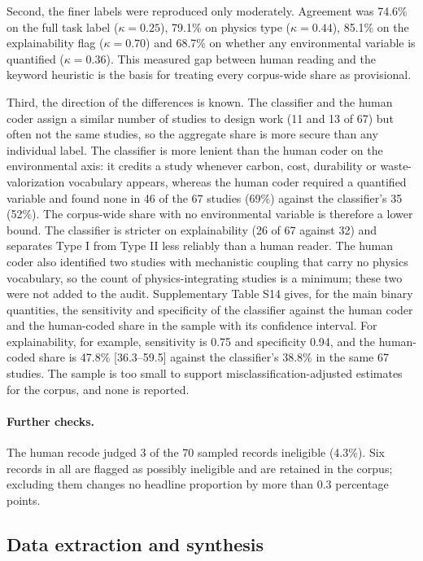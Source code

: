\documentclass[pdflatex,sn-basic]{sn-jnl}
\begin{document}
Second, the finer labels were reproduced only moderately. Agreement was 74.6\% on the full task label ($\kappa = 0.25$), 79.1\% on physics type ($\kappa = 0.44$), 85.1\% on the explainability flag ($\kappa = 0.70$) and 68.7\% on whether any environmental variable is quantified ($\kappa = 0.36$). This measured gap between human reading and the keyword heuristic is the basis for treating every corpus-wide share as provisional.

Third, the direction of the differences is known. The classifier and the human coder assign a similar number of studies to design work (11 and 13 of 67) but often not the same studies, so the aggregate share is more secure than any individual label. The classifier is more lenient than the human coder on the environmental axis: it credits a study whenever carbon, cost, durability or waste-valorization vocabulary appears, whereas the human coder required a quantified variable and found none in 46 of the 67 studies (69\%) against the classifier's 35 (52\%). The corpus-wide share with no environmental variable is therefore a lower bound. The classifier is stricter on explainability (26 of 67 against 32) and separates Type I from Type II less reliably than a human reader. The human coder also identified two studies with mechanistic coupling that carry no physics vocabulary, so the count of physics-integrating studies is a minimum; these two were not added to the audit. Supplementary Table S14 gives, for the main binary quantities, the sensitivity and specificity of the classifier against the human coder and the human-coded share in the sample with its confidence interval. For explainability, for example, sensitivity is 0.75 and specificity 0.94, and the human-coded share is 47.8\% [36.3--59.5] against the classifier's 38.8\% in the same 67 studies. The sample is too small to support misclassification-adjusted estimates for the corpus, and none is reported.

\paragraph{Further checks.} The human recode judged 3 of the 70 sampled records ineligible (4.3\%). Six records in all are flagged as possibly ineligible and are retained in the corpus; excluding them changes no headline proportion by more than 0.3 percentage points.

\subsection{Data extraction and synthesis}
\end{document}

